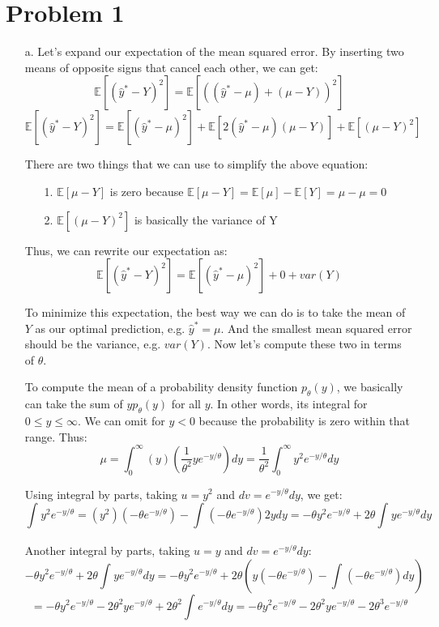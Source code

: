 \documentclass[twoside]{homework}
\begin{document}
\maketitle

\section*{Problem 1}
\begin{itemize}
    \item [a.] Let's expand our expectation of the mean squared error. By inserting two means of opposite signs that cancel each other, we can get: $$\mathbb{E}[(\hat{y}^{*}-Y)^2]=\mathbb{E}[((\hat{y}^{*}-\mu)+(\mu-Y))^2]$$
    $$\mathbb{E}[(\hat{y}^{*}-Y)^2]=\mathbb{E}[(\hat{y}^{*}-\mu)^2]+\mathbb{E}[2(\hat{y}^{*}-\mu)(\mu-Y)]+\mathbb{E}[(\mu-Y)^2]$$

    There are two things that we can use to simplify the  above equation:
    \begin{itemize}
        \item[1.] $\mathbb{E}[\mu-Y]$ is zero because $\mathbb{E}[\mu-Y]=\mathbb{E}[\mu]-\mathbb{E}[Y]=\mu-\mu=0$
        \item[2.] $\mathbb{E}[(\mu-Y)^2]$ is basically the variance of Y
    \end{itemize}

    Thus, we can rewrite our expectation as:
    $$\mathbb{E}[(\hat{y}^{*}-Y)^2]=\mathbb{E}[(\hat{y}^{*}-\mu)^2]+0+var(Y)$$

    To minimize this expectation, the best way we can do is to take the mean of $Y$ as our optimal prediction, e.g. $\hat{y}^*=\mu$. And the smallest mean squared error should be the variance, e.g. $var(Y)$. Now let's compute these two in terms of $\theta$.

    To compute the mean of a probability density function $p_\theta(y)$, we basically can take the sum of $yp_\theta(y)$ for all $y$. In other words, its integral for $0\leq{y}\leq{\infty}$. We can omit for $y<0$ because the probability is zero within that range. Thus:
    $$\mu=\int_{0}^{\infty}(y)(\frac{1}{\theta^2}ye^{-y/\theta})dy=\frac{1}{\theta^2}\int_{0}^{\infty}y^2e^{-y/\theta}dy$$

    Using integral by parts, taking $u=y^2$ and $dv=e^{-y/\theta}dy$, we get:
    $$\int_{}^{}y^2e^{-y/\theta}=(y^2)(-\theta{e^{-y/\theta}})-\int_{}^{}(-\theta{e^{-y/\theta}})2ydy=-\theta{y^2}{e^{-y/\theta}}+2\theta\int_{}^{}y{e^{-y/\theta}}dy$$

    Another integral by parts, taking $u=y$ and $dv=e^{-y/\theta}dy$:
    $$-\theta{y^2}{e^{-y/\theta}}+2\theta\int_{}^{}y{e^{-y/\theta}}dy=-\theta{y^2}{e^{-y/\theta}}+2\theta(y(-\theta{e^{-y/\theta}})-\int_{}^{}(-\theta{e^{-y/\theta}})dy)$$
    $$=-\theta{y^2}{e^{-y/\theta}}-2\theta^2y{e^{-y/\theta}}+2\theta^2\int_{}^{}e^{-y/\theta}dy=-\theta{y^2}{e^{-y/\theta}}-2\theta^2y{e^{-y/\theta}}-2\theta^3e^{-y/\theta}$$


\end{itemize}
\end{document}
